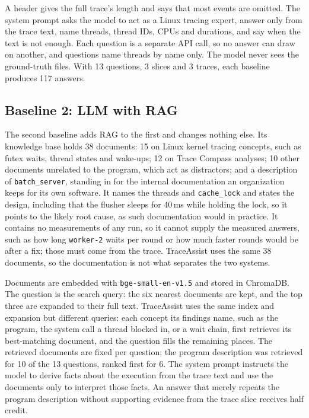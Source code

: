 \documentclass[10pt,conference]{IEEEtran}
\newcommand{\sysname}{TraceAssist\xspace}
\begin{document}
A header gives the full trace's length and says that most events are omitted. The system prompt asks the model to act as a Linux tracing expert, answer only from the trace text, name threads, thread IDs, CPUs and durations, and say when the text is not enough. Each question is a separate API call, so no answer can draw on another, and questions name threads by name only. The model never sees the ground-truth files. With 13 questions, 3 slices and 3 traces, each baseline produces 117 answers.

\subsection{Baseline 2: LLM with RAG}

The second baseline adds RAG to the first and changes nothing else. Its knowledge base holds 38 documents: 15 on Linux kernel tracing concepts, such as futex waits, thread states and wake-ups; 12 on Trace Compass analyses; 10 other documents unrelated to the program, which act as distractors; and a description of \texttt{batch\_server}, standing in for the internal documentation an organization keeps for its own software. It names the threads and \texttt{cache\_lock} and states the design, including that the flusher sleeps for 40\,ms while holding the lock, so it points to the likely root cause, as such documentation would in practice. It contains no measurements of any run, so it cannot supply the measured answers, such as how long \texttt{worker-2} waits per round or how much faster rounds would be after a fix; those must come from the trace. \sysname uses the same 38 documents, so the documentation is not what separates the two systems.

Documents are embedded with \texttt{bge-small-en-v1.5} and stored in ChromaDB. The question is the search query: the six nearest documents are kept, and the top three are expanded to their full text. \sysname uses the same index and expansion but different queries: each concept its findings name, such as the program, the system call a thread blocked in, or a wait chain, first retrieves its best-matching document, and the question fills the remaining places. The retrieved documents are fixed per question; the program description was retrieved for 10 of the 13 questions, ranked first for 6. The system prompt instructs the model to derive facts about the execution from the trace text and use the documents only to interpret those facts. An answer that merely repeats the program description without supporting evidence from the trace slice receives half credit.
\end{document}
